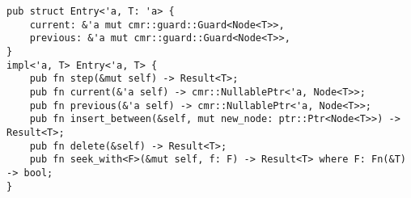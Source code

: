 \begin{lstlisting}[caption=The \code{Entry} API from the List implementation,
                   label={lst:list-entry}]
pub struct Entry<'a, T: 'a> {
    current: &'a mut cmr::guard::Guard<Node<T>>,
    previous: &'a mut cmr::guard::Guard<Node<T>>,
}
impl<'a, T> Entry<'a, T> {
    pub fn step(&mut self) -> Result<T>;
    pub fn current(&'a self) -> cmr::NullablePtr<'a, Node<T>>;
    pub fn previous(&'a self) -> cmr::NullablePtr<'a, Node<T>>;
    pub fn insert_between(&self, mut new_node: ptr::Ptr<Node<T>>) -> Result<T>;
    pub fn delete(&self) -> Result<T>;
    pub fn seek_with<F>(&mut self, f: F) -> Result<T> where F: Fn(&T) -> bool;
}
\end{lstlisting}
